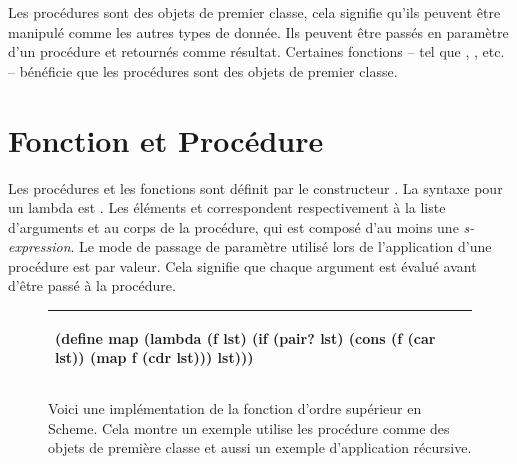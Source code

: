 Les procédures sont des objets de premier classe, cela signifie qu'ils peuvent
être manipulé comme les autres types de donnée. Ils peuvent
être passés en paramètre d'un procédure et retournés comme résultat.
Certaines fonctions -- tel que , , etc. -- bénéficie
que les procédures sont des objets de premier classe.

\section{Fonction et Procédure}

Les procédures et les fonctions sont définit par le constructeur
.  La syntaxe pour un lambda est .  Les éléments  et  correspondent
respectivement à la liste d'arguments et au corps de la procédure, qui est
composé d'au moins une \textit{s-expression}. Le mode de passage de paramètre
utilisé lors de l'application d'une procédure est par valeur.  Cela signifie
que chaque argument est évalué avant d'être passé à la procédure.


\begin{figure}[ht]
  \begin{center}
    \begin{tabular}{|l|}
      \hline
    \begin{mplisting}{0.8}
(define map
  (lambda (f lst) (if (pair? lst)
                      (cons (f (car lst)) (map f (cdr lst)))
                      lst)))
\end{mplisting}\\\hline
    \end{tabular}
  \end{center}
  \label{fig:fact1}
  \caption{Voici une implémentation de la fonction d'ordre supérieur  en Scheme.
  Cela montre un exemple utilise les procédure comme des objets de première classe et
  aussi un exemple d'application récursive.}
\end{figure}


